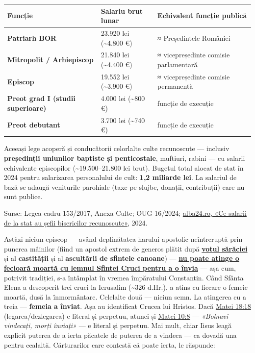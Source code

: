 \documentclass[12pt,a4paper,twoside,openany]{book}
\begin{document}
\begin{center}
\small
\begin{tabular}{L{5.3cm}L{3.5cm}L{6.1cm}}
\toprule
{}
\textbf{Funcție} & \textbf{Salariu brut lunar} & \textbf{Echivalent funcție publică} \\
\midrule
\textbf{Patriarh BOR} & 23.920 lei (\textasciitilde{}4.800 €) & ≈ Președintele României \\
\textbf{Mitropolit / Arhiepiscop} & 21.840 lei (\textasciitilde{}4.400 €) & ≈ vicepreședinte comisie parlamentară \\
\textbf{Episcop} & 19.552 lei (\textasciitilde{}3.900 €) & ≈ vicepreședinte comisie permanentă \\
\textbf{Preot grad I (studii superioare)} & 4.000 lei (\textasciitilde{}800 €) & funcție de execuție \\
\textbf{Preot debutant} & 3.700 lei (\textasciitilde{}740 €) & funcție de execuție \\
\bottomrule
\end{tabular}
\end{center}
\normalsize
Aceeași lege acoperă și conducătorii celorlalte culte recunoscute — inclusiv \textbf{președinții uniunilor baptiste și penticostale}, muftiuri, rabini — cu salarii echivalente episcopilor (\textasciitilde{}19.500–21.800 lei brut). Bugetul total alocat de stat în 2024 pentru salarizarea personalului de cult: \textbf{1,2 miliarde lei}. La salariul de bază se adaugă veniturile parohiale (taxe pe slujbe, donații, contribuții) care nu sunt publice.

Surse: Legea-cadru 153/2017, Anexa Culte; OUG 16/2024; \href{https://alba24.ro/ce-salarii-de-la-stat-au-sefii-bisericilor-recunoscute-functiile-lor-asimilate-cu-cele-publice-cel-mai-mare-venit-4800-de-euro-1088399.html}{alba24.ro, «Ce salarii de la stat au șefii bisericilor recunoscute»}, 2024.

Astăzi niciun episcop — având deplinătatea harului apostolic neîntreruptă prin punerea mâinilor (fiind un apostol extrem de generos plătit după \textbf{\underline{votul sărăciei}} și al \textbf{castității} și al \textbf{ascultării de sfintele canoane}) — \textbf{\underline{nu poate atinge o fecioară moartă cu lemnul Sfintei Cruci pentru a o învia}} — așa cum, potrivit tradiției, s-a întâmplat în vremea împăratului Constantin. Când Sfânta Elena a descoperit trei cruci la Ierusalim (\textasciitilde{}326 d.Hr.), a atins cu fiecare o femeie moartă, dusă la înmormântare. Celelalte două — niciun semn. La atingerea cu a treia — \textbf{femeia a înviat}. Așa au identificat Crucea lui Hristos. Dacă \href{https://bibliaortodoxa.ro/carte.php?id=55\&cap=18\#18}{Matei 18:18} (legarea/dezlegarea) e literal și perpetuu, atunci și \href{https://bibliaortodoxa.ro/carte.php?id=55\&cap=10\#8}{Matei 10:8} — \textit{«Bolnavi vindecați, morți înviați»} — e literal și perpetuu. Mai mult, chiar Iisus leagă explicit puterea de a ierta păcatele de puterea de a vindeca — ca dovadă una pentru cealaltă. Cărturarilor care contestă că poate ierta, le răspunde:
\end{document}
